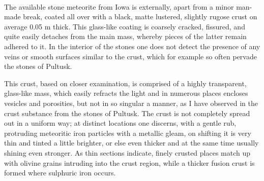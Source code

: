 \documentclass[a4paper, 12pt, oneside]{article}
\begin{document}
\paragraph*{}
The available stone meteorite from Iowa is externally, apart from a minor man-made break, coated all over with a black, matte lustered, slightly rugose crust on average 0.05 m thick. This glass-like coating is coarsely cracked, fissured, and quite easily detaches from the main mass, whereby pieces of the latter remain adhered to it. In the interior of the stones one does not detect the presence of any veins or smooth surfaces similar to the crust, which for example so often pervade the stones of Pultusk.

This crust, based on closer examination, is comprised of a highly transparent, glass-like mass, which easily refracts the light and in numerous places encloses vesicles and porosities, but not in so singular a manner, as I have observed in the crust substance from the stones of Pultusk. The crust is not completely spread out in a uniform way; at distinct locations one discerns, with a gentle rub, protruding meteoritic iron particles with a metallic gleam, on shifting it is very thin and tinted a little brighter, or else even thicker and at the same time usually shining even stronger. As thin sections indicate, finely crusted places match up with olivine grains intruding into the crust region, while a thicker fusion crust is formed where sulphuric iron occurs.
\end{document}
